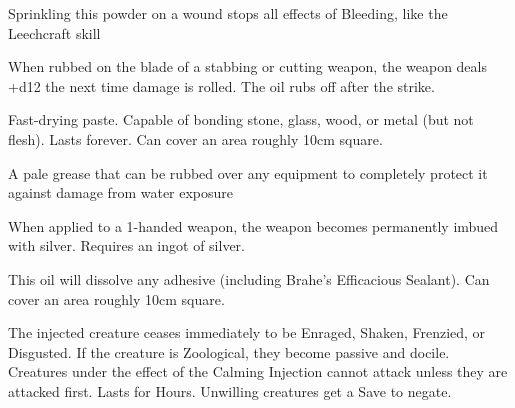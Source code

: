 {  \CHYMISTRY[
    Name=Woundseal,
    Link=chymistry-woundseal,
    Cost=Iron (1),
    Duration=0 ,
    Toxin=No,
    Narcotic=No 
  ]


  Sprinkling this powder on a wound stops all effects of Bleeding, like the Leechcraft skill 



  \CHYMISTRY[
    Name=Boyle's Sharpening Paste,
    Link=chymistry-boyles-sharpening-paste,
    Cost=Iron (1),
    Duration=0 ,
    Toxin=No,
    Narcotic=No 
  ]
  When rubbed on the blade of a stabbing or cutting weapon, the weapon deals +d12 the next time damage is rolled.  The oil rubs off after the strike.


  \CHYMISTRY[
    Name=Brahe's Efficacious Sealant,
    Link=chymistry-brahes-efficacious-sealant,
    Cost=Gold (5),
    Duration=0 ,
    Toxin=No,
    Narcotic=No 
  ]
  Fast-drying paste. Capable of bonding stone, glass, wood, or metal (but not flesh). Lasts forever.  Can cover an area roughly 10cm square.


  \CHYMISTRY[
    Name=Faivre's Aqua Grease,
    Link=chymistry-faivres-aqua-grease,
    Cost=Iron (1),
    Duration=0 ,
    Toxin=No,
    Narcotic=No 
  ]
  A pale grease that can be rubbed over any equipment to completely protect it against damage from water exposure

  \CHYMISTRY[
    Name=Tesla's Silver Wash,
    Link=chymistry-teslas-silver-wash,
    Cost=Silver (3),
    Duration=0 ,
    Toxin=No,
    Narcotic=No 
  ]
  When applied to a 1-handed weapon, the weapon becomes permanently imbued with silver.  Requires an ingot of silver.

  \newpage

  \CHYMISTRY[
    Name=Wei Boyang's Alkahest,
    Link=chymistry-wei-boyangs-alkahest,
    Cost=Gold (5),
    Duration=0 ,
    Toxin=No,
    Narcotic=No 
  ]

  This oil will dissolve any adhesive (including Brahe's Efficacious Sealant).  Can cover an area roughly 10cm square.



  \CHYMISTRY[
    Name=Al-Farabi's Calming Injection,
    Link=chymistry-al-farabis-calming-injection,
    Cost=Gold (5),
    Duration=0 ,
    Toxin=Yes,
    Narcotic=No 
  ]

  The injected creature ceases immediately to be Enraged, Shaken, Frenzied, or Disgusted.  If the creature is Zoological, they become passive and docile.  Creatures under the effect of the Calming Injection cannot attack unless they are attacked first.  Lasts for Hours. Unwilling creatures get a Save to negate.

}
